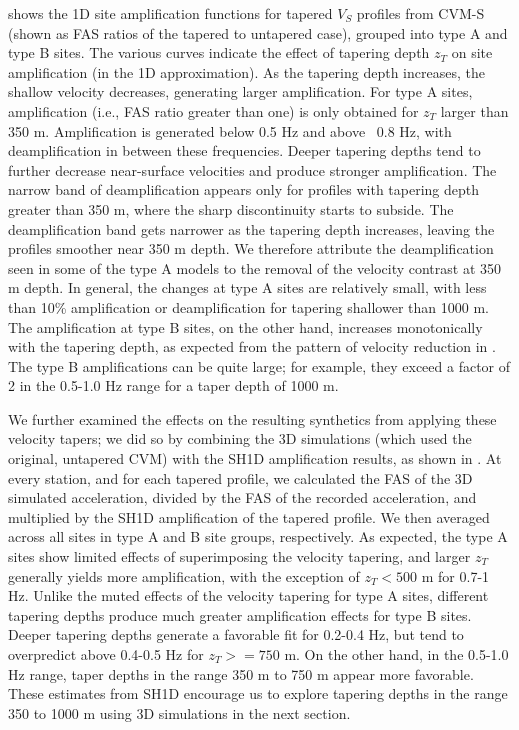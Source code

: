  shows the 1D site amplification functions for tapered $V_S$ profiles from CVM-S (shown as FAS ratios of the tapered to untapered case), grouped into type A and type B sites. The various curves indicate the effect of tapering depth $z_T$ on site amplification (in the 1D approximation). As the tapering depth increases, the shallow velocity decreases, generating larger amplification. For type A sites, amplification (i.e., FAS ratio greater than one) is only obtained for $z_T$ larger than 350 m. Amplification is generated below 0.5 Hz and above ~0.8 Hz, with deamplification in between these frequencies. Deeper tapering depths tend to further decrease near-surface velocities and produce stronger amplification. The narrow band of deamplification appears only for profiles with tapering depth greater than 350 m, where the sharp discontinuity starts to subside. The deamplification band gets narrower as the tapering depth increases, leaving the profiles smoother near 350 m depth. We therefore attribute the deamplification seen in some of the type A models to the removal of the velocity contrast at 350 m depth. In general, the changes at type A sites are relatively small, with less than 10\% amplification or deamplification for tapering shallower than 1000 m. The amplification at type B sites, on the other hand, increases monotonically with the tapering depth, as expected from the pattern of velocity reduction in . The type B amplifications can be quite large; for example, they exceed a factor of 2 in the 0.5-1.0 Hz range for a taper depth of 1000 m.

We further examined the effects on the resulting synthetics from applying these velocity tapers; we did so by combining the 3D simulations (which used the original, untapered CVM) with the SH1D amplification results, as shown in . At every station, and for each tapered profile, we calculated the FAS of the 3D simulated acceleration, divided by the FAS of the recorded acceleration, and multiplied by the SH1D amplification of the tapered profile. We then averaged across all sites in type A and B site groups, respectively. As expected, the type A sites show limited effects of superimposing the velocity tapering, and larger $z_T$ generally yields more amplification, with the exception of $z_T < 500$ m for 0.7-1 Hz. Unlike the muted effects of the velocity tapering for type A sites, different tapering depths produce much greater amplification effects for type B sites. Deeper tapering depths generate a favorable fit for 0.2-0.4 Hz, but tend to overpredict above 0.4-0.5 Hz for $z_T >= 750$ m. On the other hand, in the 0.5-1.0 Hz range, taper depths in the range 350 m to 750 m appear more favorable. These estimates from SH1D encourage us to explore tapering depths in the range 350 to 1000 m using 3D simulations in the next section.

